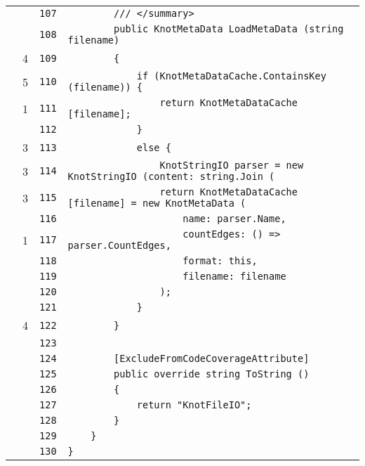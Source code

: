 \documentclass[a4paper,10pt]{article}
\begin{document}
\begin{longtable}[l]{lrrl}
\cellcolor{gray} &  & \verb~107~ & \verb~        /// </summary>~\\
\cellcolor{gray} &  & \verb~108~ & \verb~        public KnotMetaData LoadMetaData (string filename)~\\
\cellcolor{green} & 4 & \verb~109~ & \verb~        {~\\
\cellcolor{green} & 5 & \verb~110~ & \verb~            if (KnotMetaDataCache.ContainsKey (filename)) {~\\
\cellcolor{green} & 1 & \verb~111~ & \verb~                return KnotMetaDataCache [filename];~\\
\cellcolor{gray} &  & \verb~112~ & \verb~            }~\\
\cellcolor{green} & 3 & \verb~113~ & \verb~            else {~\\
\cellcolor{green} & 3 & \verb~114~ & \verb~                KnotStringIO parser = new KnotStringIO (content: string.Join (~\\
\cellcolor{green} & 3 & \verb~115~ & \verb~                return KnotMetaDataCache [filename] = new KnotMetaData (~\\
\cellcolor{gray} &  & \verb~116~ & \verb~                    name: parser.Name,~\\
\cellcolor{green} & 1 & \verb~117~ & \verb~                    countEdges: () => parser.CountEdges,~\\
\cellcolor{gray} &  & \verb~118~ & \verb~                    format: this,~\\
\cellcolor{gray} &  & \verb~119~ & \verb~                    filename: filename~\\
\cellcolor{gray} &  & \verb~120~ & \verb~                );~\\
\cellcolor{gray} &  & \verb~121~ & \verb~            }~\\
\cellcolor{green} & 4 & \verb~122~ & \verb~        }~\\
\cellcolor{gray} &  & \verb~123~ & \verb~~\\
\cellcolor{gray} &  & \verb~124~ & \verb~        [ExcludeFromCodeCoverageAttribute]~\\
\cellcolor{gray} &  & \verb~125~ & \verb~        public override string ToString ()~\\
\cellcolor{gray} &  & \verb~126~ & \verb~        {~\\
\cellcolor{gray} &  & \verb~127~ & \verb~            return "KnotFileIO";~\\
\cellcolor{gray} &  & \verb~128~ & \verb~        }~\\
\cellcolor{gray} &  & \verb~129~ & \verb~    }~\\
\cellcolor{gray} &  & \verb~130~ & \verb~}~\\
\end{longtable}
\newpage
\end{document}
